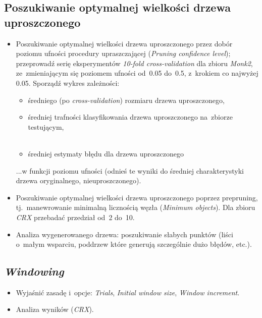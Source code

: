 \subsection{Poszukiwanie optymalnej wielkości drzewa uproszczonego}

\begin{itemize}
\item Poszukiwanie optymalnej wielkości drzewa uproszczonego przez dobór poziomu ufności procedury upraszczającej (\emph{Pruning confidence level}); przeprowadź serię eksperymentów \emph{10-fold cross-validation} dla zbioru \emph{Monk2}, ze~zmieniającym się poziomem ufności od~0.05 do~0.5, z~krokiem co najwyżej 0.05. Sporządź wykres zależności:

\begin{itemize}
\item średniego (po \emph{cross-validation}) rozmiaru drzewa uproszczonego,
\\ 
\item średniej trafności klasyfikowania drzewa uproszczonego na~zbiorze testującym,
\\ 
\\ 
\item średniej estymaty błędu dla drzewa uproszczonego
\\ 
\end{itemize}

...w funkcji poziomu ufności (odnieś te wyniki do średniej charakterystyki drzewa oryginalnego, nieuproszczonego).




\item Poszukiwanie optymalnej wielkości drzewa uproszczonego poprzez prepruning, tj.~manewrowanie minimalną licznością węzła (\emph{Minimum objects}). Dla zbioru \emph{CRX} przebadać przedział od~2 do~10.
\item Analiza wygenerowanego drzewa: poszukiwanie słabych punktów (liści o~małym wsparciu, poddrzew które generują szczególnie dużo błędów, etc.).


\end{itemize}

\subsection{\emph{Windowing}}

\begin{itemize}
\item Wyjaśnić zasadę i~opcje: \emph{Trials}, \emph{Initial window size}, \emph{Window increment}.
\item Analiza wyników (\emph{CRX}).
\end{itemize}

